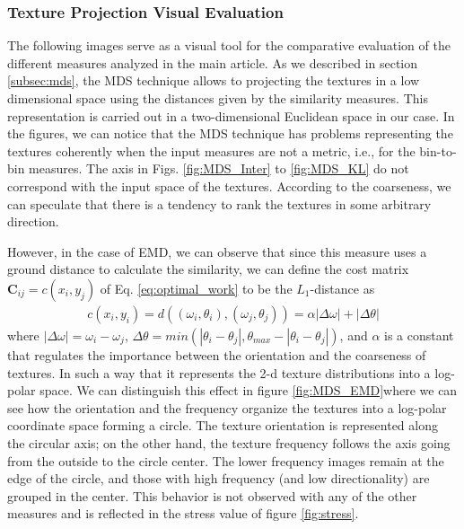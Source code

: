 \pagebreak
\subsubsection{Texture Projection Visual Evaluation}\label{sec:sm_mds}

The following images serve as a visual tool for the comparative evaluation of the different measures analyzed in the main article. As we described in section \ref{subsec:mds}, the MDS technique allows to projecting the textures in a low dimensional space using the distances given by the similarity measures. This representation is carried out in a two-dimensional Euclidean space in our case. In the figures, we can notice that the MDS technique has problems representing the textures coherently when the input measures are not a metric, i.e., for the bin-to-bin measures. The axis in  Figs. \ref{fig:MDS_Inter} to \ref{fig:MDS_KL} do not correspond with the input space of the textures. According to the coarseness, we can speculate that there is a tendency to rank the textures in some arbitrary direction.

However, in the case of EMD, we can observe that since this measure uses a ground distance to calculate the similarity, we can define the cost matrix $\mathbf{C}_{ij} = c(x_i, y_j)$ of Eq. \ref{eq:optimal_work} to be the $L_1$-distance as
\begin{eqnarray} 
 c(x_i, y_i) = d((\omega_i, \theta_i), (\omega_j, \theta_j))=\alpha|\Delta \omega| + |\Delta \theta| \label{eq:ground_distance}
\end{eqnarray}
where $|\Delta \omega| = \omega_i - \omega_j$, $\Delta \theta=min(|\theta_i-\theta_j|, \theta_{max} - |\theta_i-\theta_j|)$, and $\alpha$ is a constant that regulates the importance between the orientation and the coarseness of textures. In such a way that it represents the 2-d texture distributions into a log-polar space. We can distinguish this effect in figure \ref{fig:MDS_EMD}where we can see how the orientation and the frequency organize the textures into a log-polar coordinate space forming a circle. The texture orientation is represented along the circular axis; on the other hand, the texture frequency follows the axis going from the outside to the circle center. The lower frequency images remain at the edge of the circle, and those with high frequency (and low directionality) are grouped in the center. This behavior is not observed with any of the other measures and is reflected in the stress value of figure \ref{fig:stress}.

